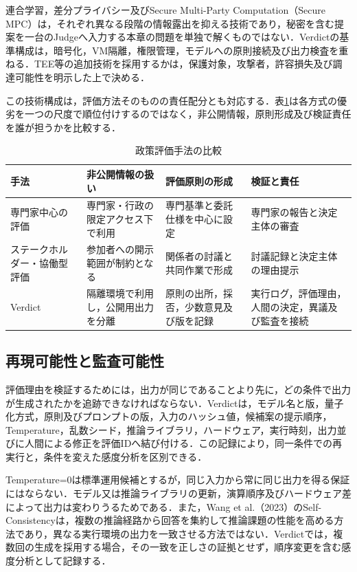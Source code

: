 連合学習，差分プライバシー及びSecure Multi-Party Computation（Secure MPC）は，それぞれ異なる段階の情報露出を抑える技術であり，秘密を含む提案を一台のJudgeへ入力する本章の問題を単独で解くものではない．Verdictの基準構成は，暗号化，VM隔離，権限管理，モデルへの原則接続及び出力検査を重ねる．TEE等の追加技術を採用するかは，保護対象，攻撃者，許容損失及び調達可能性を明示した上で決める．

この技術構成は，評価方法そのものの責任配分とも対応する．表\ref{tab:ch5_method_comparison}は各方式の優劣を一つの尺度で順位付けするのではなく，非公開情報，原則形成及び検証責任を誰が担うかを比較する．

\begin{table}[htb]
\caption{政策評価手法の比較}
\label{tab:ch5_method_comparison}
\centering
\small
\begin{tabularx}{\columnwidth}{p{}p{}p{}X}
\toprule
手法 & 非公開情報の扱い & 評価原則の形成 & 検証と責任 \\
\midrule
専門家中心の評価 & 専門家・行政の限定アクセス下で利用 & 専門基準と委託仕様を中心に設定 & 専門家の報告と決定主体の審査 \\
ステークホルダー・協働型評価 & 参加者への開示範囲が制約となる & 関係者の討議と共同作業で形成 & 討議記録と決定主体の理由提示 \\
Verdict & 隔離環境で利用し，公開用出力を分離 & 原則の出所，採否，少数意見及び版を記録 & 実行ログ，評価理由，人間の決定，異議及び監査を接続 \\
\bottomrule
\end{tabularx}
\end{table}

\subsection{再現可能性と監査可能性}

評価理由を検証するためには，出力が同じであることより先に，どの条件で出力が生成されたかを追跡できなければならない．Verdictは，モデル名と版，量子化方式，原則及びプロンプトの版，入力のハッシュ値，候補案の提示順序，Temperature，乱数シード，推論ライブラリ，ハードウェア，実行時刻，出力並びに人間による修正を評価IDへ結び付ける．この記録により，同一条件での再実行と，条件を変えた感度分析を区別できる．

Temperature=0は標準運用候補とするが，同じ入力から常に同じ出力を得る保証にはならない．モデル又は推論ライブラリの更新，演算順序及びハードウェア差によって出力は変わりうるためである．また，Wang et al.（2023）のSelf-Consistencyは，複数の推論経路から回答を集約して推論課題の性能を高める方法であり，異なる実行環境の出力を一致させる方法ではない\cite{wang2023selfconsistency}．Verdictでは，複数回の生成を採用する場合，その一致を正しさの証拠とせず，順序変更を含む感度分析として記録する．

